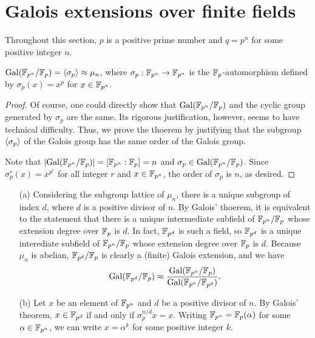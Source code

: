 \section{Galois extensions over finite fields}

Throughout this section, $p$ is a positive prime number and $q=p^n$ for some positive integer $n$.

\begin{thm}
    ${\textrm{Gal}({{\mathbb{F}}_{p^n}/{\mathbb{F}}_p})}={\left\langle{\sigma_p}\right\rangle}\approx \mu_n$, where $\sigma_p: {\mathbb{F}}_{p^n}\rightarrow{\mathbb{F}}_{p^n}$ is the ${\mathbb{F}}_p$-automorphism defined by $\sigma_p(x)=x^p$ for $x\in{\mathbb{F}}_{p^n}$.
\end{thm}
\begin{proof}
    Of course, one could directly show that ${\textrm{Gal}({{\mathbb{F}}_{p^n}/{\mathbb{F}}_p})}$ and the cyclic group generated by $\sigma_p$ are the same.
    Its rigorous justification, however, seems to have technical difficulty.
    Thus, we prove the thoerem by justifying that the subgroup ${\left\langle{\sigma_p}\right\rangle}$ of the Galois group has the same order of the Galois group.

    Note that $|{\textrm{Gal}({{\mathbb{F}}_{p^n}/{\mathbb{F}}_p})}|=[{\mathbb{F}}_{p^n}: {\mathbb{F}}_p]=n$ and $\sigma_p\in {\textrm{Gal}({{\mathbb{F}}_{p^n}/{\mathbb{F}}_p})}$.
    Since $\sigma_p^r(x)=x^{p^r}$ for all integer $r$ and $x\in {\mathbb{F}}_{p^n}$, the order of $\sigma_p$ is $n$, as desired.
\end{proof}
\begin{obs}
    \begin{enumerate}
        \item[(a)]
        {
            Considering the subgroup lattice of $\mu_n$, there is a unique subgroup of index $d$, where $d$ is a positive divisor of $n$.
            By Galois' thoerem, it is equivalent to the statement that there is a unique intermediate subfield of ${\mathbb{F}}_{p^n}/{\mathbb{F}}_p$ whose extension degree over ${\mathbb{F}}_p$ is $d$.
            In fact, ${\mathbb{F}}_{p^d}$ is such a field, so ${\mathbb{F}}_{p^d}$ is a unique interediate subfield of ${\mathbb{F}}_{p^n}/{\mathbb{F}}_p$ whose extension degree over ${\mathbb{F}}_p$ is $d$.
            Because $\mu_n$ is abelian, ${\mathbb{F}}_{p^d}/{\mathbb{F}}_p$ is clearly a (finite) Galois extension, and we have
            \begin{align*}
                {\textrm{Gal}({{\mathbb{F}}_{p^d}/{\mathbb{F}}_p})}\approx\frac{{\textrm{Gal}({{\mathbb{F}}_{p^n}/{\mathbb{F}}_p})}}{{\textrm{Gal}({{\mathbb{F}}_{p^n}/{\mathbb{F}}_{p^d}})}}.
            \end{align*}        
        }
        \item[(b)]
        {
            Let $x$ be an element of ${\mathbb{F}}_{p^n}$ and $d$ be a positive divisor of $n$.
            By Galois' theorem, $x\in{\mathbb{F}}_{p^d}$ if and only if $\sigma_p^{n/d} x=x$.
            Writing ${\mathbb{F}}_{p^n}={\mathbb{F}}_p(\alpha)$ for some $\alpha\in{\mathbb{F}}_{p^n}$, we can write $x=\alpha^k$ for some positive integer $k$.
        }
    \end{enumerate}
\end{obs}

